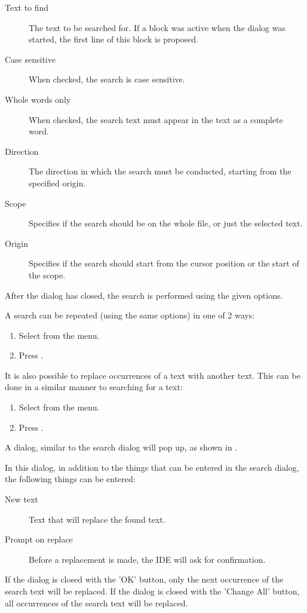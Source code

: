 
\begin{description}
\item[Text to find] The text to be searched for. If a block was active when
the dialog was started, the first line of this block is proposed.
\item[Case sensitive] When checked, the search is case sensitive.
\item[Whole words only] When checked, the search text must appear in the
text as a complete word.
\item[Direction] The direction in which the search must be conducted,
starting from the specified origin.
\item[Scope] Specifies if the search should be on the whole file, or just the selected
text.
\item[Origin] Specifies if the search should start from the cursor position or the start
of the scope.
\end{description}
After the dialog has closed, the search is performed using the given options.

A search can be repeated (using the same options) in one of 2 ways:
\begin{enumerate}
\item Select  from the menu.
\item Press .
\end{enumerate}

It is also possible to replace occurrences of a text with another text.
This can be done in a similar manner to searching for a text:
\begin{enumerate}
\item Select  from the menu.
\item Press .
\end{enumerate}
A dialog, similar to the search dialog will pop up, as shown in .


In this dialog, in addition to the things that can be entered in the
search dialog, the following things can be entered:
\begin{description}
\item [New text] Text that will replace the found text.
\item [Prompt on replace] Before a replacement is made, the IDE will ask for
confirmation.
\end{description}
If the dialog is closed with the 'OK' button, only the next occurrence of
the search text will be replaced.
If the dialog is closed with the 'Change All' button, all occurrences of
the search text will be replaced.

